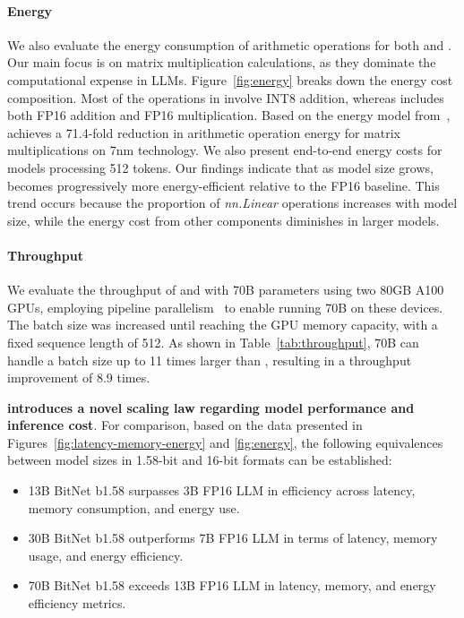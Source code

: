 \paragraph{Energy}

We also evaluate the energy consumption of arithmetic operations for both  and . Our main focus is on matrix multiplication calculations, as they dominate the computational expense in LLMs. Figure~\ref{fig:energy} breaks down the energy cost composition. Most of the operations in  involve INT8 addition, whereas  includes both FP16 addition and FP16 multiplication. Based on the energy model from~\cite{energycost, pokebnn},  achieves a 71.4-fold reduction in arithmetic operation energy for matrix multiplications on 7nm technology. We also present end-to-end energy costs for models processing 512 tokens. Our findings indicate that as model size grows,  becomes progressively more energy-efficient relative to the FP16  baseline. This trend occurs because the proportion of \emph{nn.Linear} operations increases with model size, while the energy cost from other components diminishes in larger models.

\paragraph{Throughput}

We evaluate the throughput of  and  with 70B parameters using two 80GB A100 GPUs, employing pipeline parallelism~\cite{gpipe} to enable running  70B on these devices. The batch size was increased until reaching the GPU memory capacity, with a fixed sequence length of 512. As shown in Table~\ref{tab:throughput},  70B can handle a batch size up to 11 times larger than , resulting in a throughput improvement of 8.9 times.

\textbf{ introduces a novel scaling law regarding model performance and inference cost}. For comparison, based on the data presented in Figures~\ref{fig:latency-memory-energy} and \ref{fig:energy}, the following equivalences between model sizes in 1.58-bit and 16-bit formats can be established:

\begin{itemize}
    \item 13B BitNet b1.58 surpasses 3B FP16 LLM in efficiency across latency, memory consumption, and energy use.
    \item 30B BitNet b1.58 outperforms 7B FP16 LLM in terms of latency, memory usage, and energy efficiency.
    \item 70B BitNet b1.58 exceeds 13B FP16 LLM in latency, memory, and energy efficiency metrics.
\end{itemize}

